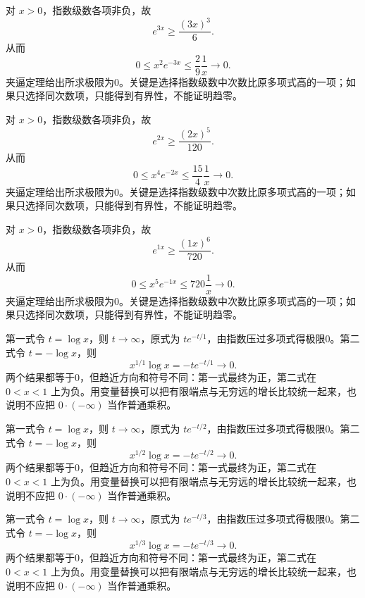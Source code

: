 \documentclass[12pt,fontset=fandol]{ctexart}
\begin{document}
\begin{solve}\label{ans:c4q10}
对 $x>0$，指数级数各项非负，故
\[
e^{3x}\ge\frac{(3x)^{3}}{6}.
\]
从而
\[
0\le x^{2}e^{-3x}\le \frac{2}{9}\frac1x\longrightarrow0.
\]
夹逼定理给出所求极限为0。关键是选择指数级数中次数比原多项式高的一项；如果只选择同次数项，只能得到有界性，不能证明趋零。
\end{solve}

\begin{solve}\label{ans:c4q11}
对 $x>0$，指数级数各项非负，故
\[
e^{2x}\ge\frac{(2x)^{5}}{120}.
\]
从而
\[
0\le x^{4}e^{-2x}\le \frac{15}{4}\frac1x\longrightarrow0.
\]
夹逼定理给出所求极限为0。关键是选择指数级数中次数比原多项式高的一项；如果只选择同次数项，只能得到有界性，不能证明趋零。
\end{solve}

\begin{solve}\label{ans:c4q12}
对 $x>0$，指数级数各项非负，故
\[
e^{1x}\ge\frac{(1x)^{6}}{720}.
\]
从而
\[
0\le x^{5}e^{-1x}\le 720\frac1x\longrightarrow0.
\]
夹逼定理给出所求极限为0。关键是选择指数级数中次数比原多项式高的一项；如果只选择同次数项，只能得到有界性，不能证明趋零。
\end{solve}

\begin{solve}\label{ans:c4q13}
第一式令 $t=\log x$，则 $t\to\infty$，原式为 $te^{-t/1}$，由指数压过多项式得极限0。第二式令 $t=-\log x$，则
\[
x^{1/1}\log x=-te^{-t/1}\longrightarrow0.
\]
两个结果都等于0，但趋近方向和符号不同：第一式最终为正，第二式在 $0<x<1$ 上为负。用变量替换可以把有限端点与无穷远的增长比较统一起来，也说明不应把 $0\cdot(-\infty)$ 当作普通乘积。
\end{solve}

\begin{solve}\label{ans:c4q14}
第一式令 $t=\log x$，则 $t\to\infty$，原式为 $te^{-t/2}$，由指数压过多项式得极限0。第二式令 $t=-\log x$，则
\[
x^{1/2}\log x=-te^{-t/2}\longrightarrow0.
\]
两个结果都等于0，但趋近方向和符号不同：第一式最终为正，第二式在 $0<x<1$ 上为负。用变量替换可以把有限端点与无穷远的增长比较统一起来，也说明不应把 $0\cdot(-\infty)$ 当作普通乘积。
\end{solve}

\begin{solve}\label{ans:c4q15}
第一式令 $t=\log x$，则 $t\to\infty$，原式为 $te^{-t/3}$，由指数压过多项式得极限0。第二式令 $t=-\log x$，则
\[
x^{1/3}\log x=-te^{-t/3}\longrightarrow0.
\]
两个结果都等于0，但趋近方向和符号不同：第一式最终为正，第二式在 $0<x<1$ 上为负。用变量替换可以把有限端点与无穷远的增长比较统一起来，也说明不应把 $0\cdot(-\infty)$ 当作普通乘积。
\end{solve}
\end{document}
